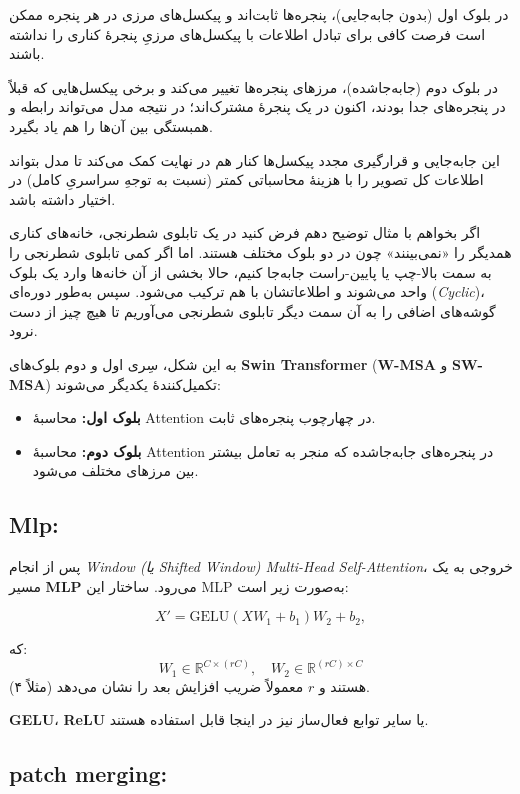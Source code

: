 در بلوک اول (بدون جابه‌جایی)، پنجره‌ها ثابت‌اند و پیکسل‌های مرزی در هر پنجره ممکن است فرصت کافی برای تبادل اطلاعات با پیکسل‌های مرزیِ پنجرهٔ کناری را نداشته باشند.

در بلوک دوم (جابه‌جاشده)، مرزهای پنجره‌ها تغییر می‌کند و برخی پیکسل‌هایی که قبلاً در پنجره‌های جدا بودند، اکنون در یک پنجرهٔ مشترک‌اند؛ در نتیجه مدل می‌تواند رابطه و همبستگی بین آن‌ها را هم یاد بگیرد.

این جابه‌جایی و قرارگیری مجدد پیکسل‌ها کنار هم در نهایت کمک می‌کند تا مدل بتواند اطلاعات کل تصویر را با هزینهٔ محاسباتی کمتر (نسبت به توجهِ سراسریِ کامل) در اختیار داشته باشد.



اگر بخواهم با مثال توضیح دهم فرض کنید در یک تابلوی شطرنجی، خانه‌های کناری همدیگر را «نمی‌بینند» چون در دو بلوک مختلف هستند. 
اما اگر کمی تابلوی شطرنجی را به سمت بالا-چپ یا پایین-راست جابه‌جا کنیم، 
حالا بخشی از آن خانه‌ها وارد یک بلوک واحد می‌شوند و اطلاعاتشان با هم ترکیب می‌شود. 
سپس به‌طور دوره‌ای (\textit{Cyclic})، گوشه‌های اضافی را به آن سمت دیگر تابلوی شطرنجی می‌آوریم 
تا هیچ چیز از دست نرود. 

به این شکل، سِری اول و دوم بلوک‌های \textbf{Swin Transformer} (\textbf{W-MSA} و \textbf{SW-MSA}) 
تکمیل‌کنندهٔ یکدیگر می‌شوند:

\begin{itemize}
	\item \textbf{بلوک اول:} محاسبهٔ Attention در چهارچوب پنجره‌های ثابت.
	\item \textbf{بلوک دوم:} محاسبهٔ Attention در پنجره‌های جابه‌جاشده که منجر به تعامل بیشتر بین مرزهای مختلف می‌شود.
\end{itemize}


\subsection{Mlp:}


پس از انجام \textit{Window (یا Shifted Window) Multi-Head Self-Attention}، 
خروجی به یک مسیر \textbf{MLP} می‌رود. ساختار این MLP به‌صورت زیر است:

\[
X' = \mathrm{GELU}(X W_1 + b_1) W_2 + b_2,
\]

که:
\[
W_1 \in \mathbb{R}^{C \times (rC)}, 
\quad
W_2 \in \mathbb{R}^{(rC) \times C}
\]
هستند و \(\displaystyle r\) معمولاً ضریب افزایش بعد را نشان می‌دهد (مثلاً ۴). 

\textbf{GELU}، \textbf{ReLU} یا سایر توابع فعال‌ساز نیز در اینجا قابل استفاده هستند.

\subsection{patch merging:}

